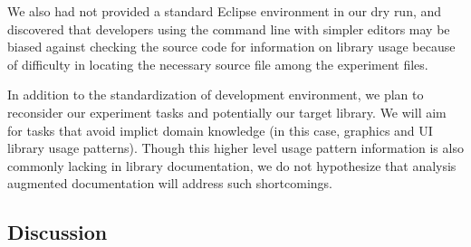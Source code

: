 We also had not provided a standard Eclipse environment in our dry run, and
discovered that developers using the command line with simpler editors may be biased against
checking the source code for information on library usage because of difficulty
in locating the necessary source file among the experiment files.

In addition to the standardization of development environment, we plan to
reconsider our experiment tasks and potentially our target library. We will aim
for tasks that avoid implict domain knowledge (in this case, graphics and UI
library usage patterns). Though this higher level usage pattern information is
also commonly lacking in library documentation, we do not hypothesize that
analysis augmented documentation will address such shortcomings.

\subsection{Discussion}
